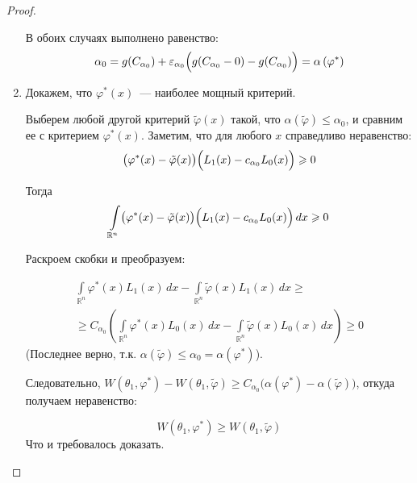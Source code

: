 \begin{proof}
\begin{enumerate}
    В обоих случаях выполнено равенство:
    \begin{equation*}
        \alpha_{0} = 
        g(C_{\alpha_{0}}) + \varepsilon_{\alpha_{0}}\Bigl(g(C_{\alpha_{0}} - 0) - g(C_{\alpha_{0}})\Bigr) =
        \alpha\left(\varphi^{*}\right)
    \end{equation*}

    \item Докажем, что $\varphi^{*}(x)$~--- наиболее мощный критерий.

    Выберем любой другой критерий $\tilde{\varphi}(x)$ такой, что $\alpha(\tilde{\varphi}) \leqslant \alpha_{0}$, 
    и сравним ее с критерием $\varphi^{*}(x)$. 
    Заметим, что для любого $x$ справедливо неравенство:
    \begin{equation*}
        \bigl(\varphi^{*}(x)-\tilde{\varphi}(x)\bigr) \Bigl(L_{1}(x)-c_{\alpha_{0}} L_{0}(x)\Bigr) \geqslant 0
    \end{equation*}

    Тогда
    \begin{equation*}
        \int\limits_{\mathbb{R}^{n}} \bigl(\varphi^{*}(x)-\tilde{\varphi}(x)\bigr) \Bigl(L_{1}(x)-c_{\alpha_{0}} L_{0}(x)\Bigr) \, dx \geqslant 0
    \end{equation*}

    Раскроем скобки и преобразуем:

    \begin{multline*}
        \int\limits_{\mathbb{R}^{n}} \varphi^{*}(x) L_{1}(x) \, dx - \int\limits_{\mathbb{R}^{n}} \tilde{\varphi}(x) L_{1}(x) \,dx \geqslant \\
        \geqslant C_{\alpha_{0}}\left(\int\limits_{\mathbb{R}^{n}} \varphi^{*}(x) L_{0}(x) \,dx - \int\limits_{\mathbb{R}^{n}} \tilde{\varphi}(x) L_{0}(x) \,dx\right) \geqslant 0
    \end{multline*}
    (Последнее верно, т.к. $\alpha(\tilde{\varphi}) \leqslant \alpha_0 = \alpha(\varphi^*)$).
    
    \smallskip
    Следовательно, $W \left(\theta_1, \varphi^{*}\right) - W(\theta_1, \tilde{\varphi}) \geqslant C_{\alpha_{0}}\bigl(\alpha\left(\varphi^{*}\right)-\alpha(\tilde{\varphi})\bigr)$, откуда получаем неравенство:

    \begin{equation*}
        W\left(\theta_1, \varphi^{*}\right) \geqslant W(\theta_1, \tilde{\varphi})
    \end{equation*}
    Что и требовалось доказать.
    \end{enumerate}
\end{proof}

